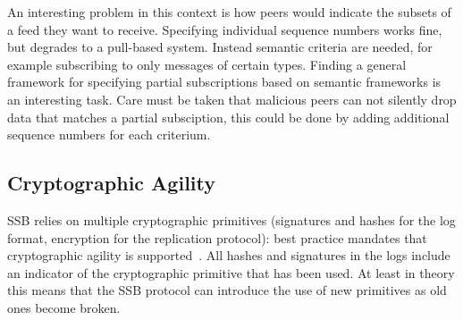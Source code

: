 \documentclass[10pt,sigconf,rewiew]{acmart}
\begin{document}
An interesting problem in this context is how peers would indicate the subsets of a feed they want to receive. Specifying individual sequence numbers works fine, but degrades to a pull-based system. Instead semantic criteria are needed, for example subscribing to only messages of certain types. Finding a general framework for specifying partial subscriptions based on semantic frameworks is an interesting task. Care must be taken that malicious peers can not silently drop data that matches a partial subsciption, this could be done by adding additional sequence numbers for each criterium.
%
%
%



\subsection{Cryptographic Agility}


SSB relies on multiple cryptographic primitives (signatures and hashes for the log format, encryption for the replication protocol): best practice mandates that cryptographic agility is supported~\cite{nelson2011crypto}. All hashes and signatures in the logs include an indicator of the cryptographic primitive that has been used. At least in theory this means that the SSB protocol can introduce the use of new primitives as old ones become broken.
\end{document}
